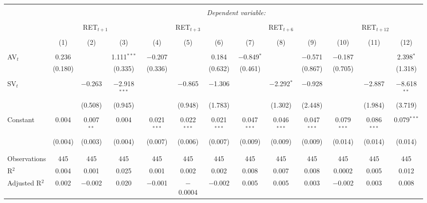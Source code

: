 
\begin{table}[!htbp] \centering 
  \caption{} 
  \label{} 
\begin{tabular}{@{\extracolsep{5pt}}lcccccccccccc} 
\\[-1.8ex]\hline 
\hline \\[-1.8ex] 
 & \multicolumn{12}{c}{\textit{Dependent variable:}} \\ 
\cline{2-13} 
\\[-1.8ex] & \multicolumn{3}{c}{RET$_{t+1}$} & \multicolumn{3}{c}{RET$_{t+3}$} & \multicolumn{3}{c}{RET$_{t+6}$} & \multicolumn{3}{c}{RET$_{t+12}$} \\ 
\\[-1.8ex] & (1) & (2) & (3) & (4) & (5) & (6) & (7) & (8) & (9) & (10) & (11) & (12)\\ 
\hline \\[-1.8ex] 
 AV$_{t}$ & 0.236 &  & 1.111$^{***}$ & $-$0.207 &  & 0.184 & $-$0.849$^{*}$ &  & $-$0.571 & $-$0.187 &  & 2.398$^{*}$ \\ 
  & (0.180) &  & (0.335) & (0.336) &  & (0.632) & (0.461) &  & (0.867) & (0.705) &  & (1.318) \\ 
  & & & & & & & & & & & & \\ 
 SV$_{t}$ &  & $-$0.263 & $-$2.918$^{***}$ &  & $-$0.865 & $-$1.306 &  & $-$2.292$^{*}$ & $-$0.928 &  & $-$2.887 & $-$8.618$^{**}$ \\ 
  &  & (0.508) & (0.945) &  & (0.948) & (1.783) &  & (1.302) & (2.448) &  & (1.984) & (3.719) \\ 
  & & & & & & & & & & & & \\ 
 Constant & 0.004 & 0.007$^{**}$ & 0.004 & 0.021$^{***}$ & 0.022$^{***}$ & 0.021$^{***}$ & 0.047$^{***}$ & 0.046$^{***}$ & 0.047$^{***}$ & 0.079$^{***}$ & 0.086$^{***}$ & 0.079$^{***}$ \\ 
  & (0.004) & (0.003) & (0.004) & (0.007) & (0.006) & (0.007) & (0.009) & (0.009) & (0.009) & (0.014) & (0.014) & (0.014) \\ 
  & & & & & & & & & & & & \\ 
\hline \\[-1.8ex] 
Observations & 445 & 445 & 445 & 445 & 445 & 445 & 445 & 445 & 445 & 445 & 445 & 445 \\ 
R$^{2}$ & 0.004 & 0.001 & 0.025 & 0.001 & 0.002 & 0.002 & 0.008 & 0.007 & 0.008 & 0.0002 & 0.005 & 0.012 \\ 
Adjusted R$^{2}$ & 0.002 & $-$0.002 & 0.020 & $-$0.001 & $-$0.0004 & $-$0.002 & 0.005 & 0.005 & 0.003 & $-$0.002 & 0.003 & 0.008 \\ 

\end{tabular}
\end{table}
